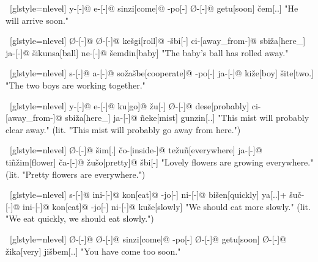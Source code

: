 \ex~[glstyle=nlevel]
\begingl
\glpreamble {}
\endpreamble
y-[{\Subj}-]@
e-[{\Pfv}-]@
sinzi[come]@
-po[-{\Hg}]
Ø-[{\Pfv}-]@
getu[soon]
\v{c}em[{\T}.{\Hg}.{\Nom}]
\glft "He will arrive soon."
\endgl
\xe

\ex~[glstyle=nlevel]
\begingl
\glpreamble {}
\endpreamble
Ø-[{\Ind}-]@
Ø-[{\Pfv}-]@
ke\v{s}gi[roll]@
-\v{s}bi[-{\Inan}]
ci-[away\_from-]@
sbi\v{z}a[here\_{\Prox}]
ja-[{\Nom}-]@
\v{s}ikunsa[ball]
ne-[{\Gen}-]@
\v{s}emdin[baby]
\glft "The baby's ball has rolled away."
\endgl
\xe

\ex~[glstyle=nlevel]
\begingl
\glpreamble {}
\endpreamble
s-[{\Ind}-]@
a-[{\Prog}-]@
so\v{z}a\v{s}be[cooperate]@
-po[-{\Hg}]
ja-[{\Nom}-]@
ki\v{z}e[boy]
\v{s}ite[two.{\Hg}]
\glft "The two boys are working together."
\endgl
\xe

\ex~[glstyle=nlevel]
\begingl
\glpreamble {}
\endpreamble
y-[{\Subj}-]@
e-[{\Pfv}-]@
ku[go]@
\v{z}u[-{\An}]
Ø-[{\Pfv}-]@
dese[probably]
ci-[away\_from-]@
sbi\v{z}a[here\_{\Prox}]
ja-[{\Nom}-]@
ñeke[mist]
gunzin[{\Dem}.{\Prox}.{\Hg}]
\glft "This mist will probably clear away." (lit. "This mist will probably go away from here.")
\endgl
\xe

\ex~[glstyle=nlevel]
\begingl
\glpreamble {}
\endpreamble
Ø-[{\Ind}-]@
\v{s}im[{\Cop}.{\Loc}]
\v{c}o-[inside-]@
te\v{z}uñ[everywhere]
ja-[{\Nom}-]@
tiñ\v{z}im[flower]
\v{c}a-[{\Nom}-]@
\v{z}u\v{s}o[pretty]@
\v{s}bi[-{\Inan}]
\glft "Lovely flowers are growing everywhere." (lit. "Pretty flowers are everywhere.")
\endgl
\xe

\ex~[glstyle=nlevel]
\begingl
\glpreamble {}
\endpreamble
s-[{\Ind}-]@
ini-[{\Hab}-]@
kon[eat]@
-jo[-{\Hg}]
ni-[{\Hab}-]@
bi\v{s}en[quickly]
ya[{\Fin}.{\Hg}.{\Erg}]+
\v{s}u\v{c}-[{\Deo}-]@
ini-[{\Hab}-]@
kon[eat]@
-jo[-{\Hg}]
ni-[{\Hab}-]@
ku\v{s}e[slowly]
\glft "We should eat more slowly." (lit. "We eat quickly, we should eat slowly.")
\endgl
\xe

\ex~[glstyle=nlevel]
\begingl
\glpreamble {}
\endpreamble
Ø-[{\Ind}-]@
Ø-[{\Pfv}-]@
sinzi[come]@
-po[-{\Hg}]
Ø-[{\Pfv}-]@
getu[soon]
Ø-[{\Pfv}-]@
\v{z}ika[very]
ji\v{s}bem[{\Spol}.{\Hg}.{\Nom}]
\glft "You have come too soon."
\endgl
\xe

